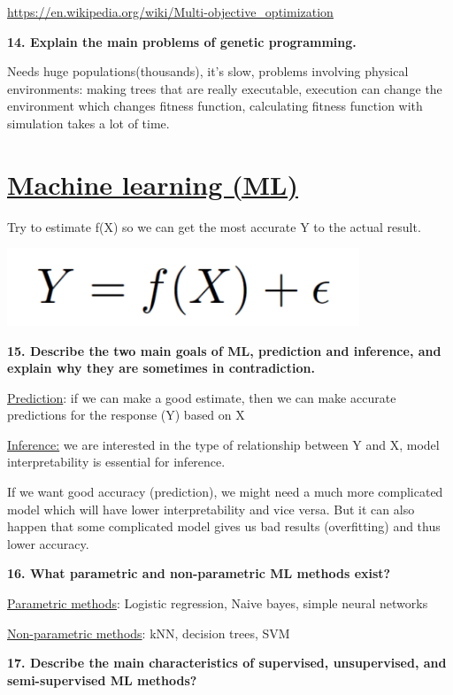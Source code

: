 \href{https://en.wikipedia.org/wiki/Multi-objective_optimization}{\underline{https://en.wikipedia.org/wiki/Multi-objective\_optimization}}

\textbf{14. Explain the main problems of genetic programming.}

Needs huge populations(thousands), it's slow, problems involving
physical environments: making trees that are really executable,
execution can change the environment which changes fitness function,
calculating fitness function with simulation takes a lot of time.

\hypertarget{machine-learning-ml}{%
\section{\texorpdfstring{\underline{Machine learning
(ML)}}{Machine learning (ML)}}\label{machine-learning-ml}}

Try to estimate f(X) so we can get the most accurate Y to the actual
result.

\includegraphics[width=4.15104in,height=0.91284in]{media/image5.png}

\textbf{15. Describe the two main goals of ML, prediction and inference,
and explain why they are sometimes in contradiction.}

\underline{Prediction}: if we can make a good estimate, then we can make
accurate predictions for the response (Y) based on X

\underline{Inference:} we are interested in the type of relationship
between Y and X, model interpretability is essential for inference.

If we want good accuracy (prediction), we might need a much more
complicated model which will have lower interpretability and vice versa.
But it can also happen that some complicated model gives us bad results
(overfitting) and thus lower accuracy.

\textbf{16. What parametric and non-parametric ML methods exist?}

\underline{Parametric methods}: Logistic regression, Naive bayes, simple
neural networks

\underline{Non-parametric methods}: kNN, decision trees, SVM

\textbf{17. Describe the main characteristics of supervised,
unsupervised, and semi-supervised ML methods?}

